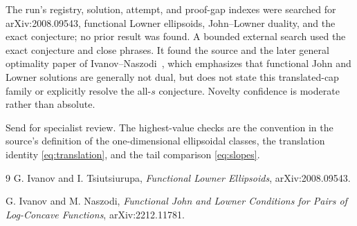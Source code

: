 \documentclass[11pt]{article}
\begin{document}
The run's registry, solution, attempt, and proof-gap indexes were searched for
arXiv:2008.09543, functional Lowner ellipsoids, John--Lowner duality, and the
exact conjecture; no prior result was found.  A bounded external search used
the exact conjecture and close phrases.  It found the source and the later
general optimality paper of Ivanov--Naszodi~\cite{IN}, which emphasizes that
functional John and Lowner solutions are generally not dual, but does not
state this translated-cap family or explicitly resolve the all-$s$ conjecture.
Novelty confidence is moderate rather than absolute.

Send for specialist review.  The highest-value checks are the convention in
the source's definition of the one-dimensional ellipsoidal classes, the
translation identity \eqref{eq:translation}, and the tail comparison
\eqref{eq:slopes}.

\begin{thebibliography}{9}
G. Ivanov and I. Tsiutsiurupa,
\emph{Functional Lowner Ellipsoids},
arXiv:2008.09543.

G. Ivanov and M. Naszodi,
\emph{Functional John and Lowner Conditions for Pairs of Log-Concave
Functions},
arXiv:2212.11781.
\end{thebibliography}
\end{document}
